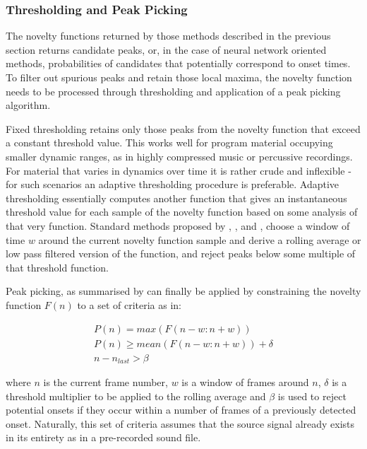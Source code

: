 \subsubsection{Thresholding and Peak Picking}
\label{sec:peak_picking}

The novelty functions returned by those methods described in the previous section returns candidate peaks, or, in the case of neural network oriented methods, probabilities of candidates that potentially correspond to onset times. To filter out spurious peaks and retain those local maxima, the novelty function needs to be processed through thresholding and application of a peak picking algorithm. 

Fixed thresholding retains only those peaks from the novelty function that exceed a constant threshold value. This works well for program material occupying smaller dynamic ranges, as in highly compressed music or percussive recordings. For material that varies in dynamics over time it is rather crude and inflexible - for such scenarios an adaptive thresholding procedure is preferable. Adaptive thresholding essentially computes another function that gives an instantaneous threshold value for each sample of the novelty function based on some analysis of that very function. Standard methods proposed by
\cite{Bello2005}, \cite{Dixon2006}, \cite{Bock2012a} and \cite{Bock2013}, choose a window of time $w$ around the current novelty function sample and derive a rolling average or low pass filtered version of the function, and reject peaks below some multiple of that threshold function.

Peak picking, as summarised by \cite{Bock2012a} can finally be applied by constraining the novelty function $F(n)$ to a set of criteria as in:

\begin{equation}
  \label{eq:peak_picking}
  \begin{gathered}
P(n)=max(F(n-w:n+w))\\
P(n)\geq mean(F(n-w:n+w))+\delta\\
n-n_{last}>\beta
  \end{gathered}
\end{equation}

where $n$ is the current frame number, $w$ is a window of frames around $n$, $\delta$ is a threshold multiplier to be applied to the rolling average and $\beta$ is used to reject potential onsets if they occur within a number of frames of a previously detected onset. Naturally, this set of criteria assumes that the source signal already exists in its entirety as in a pre-recorded sound file.

